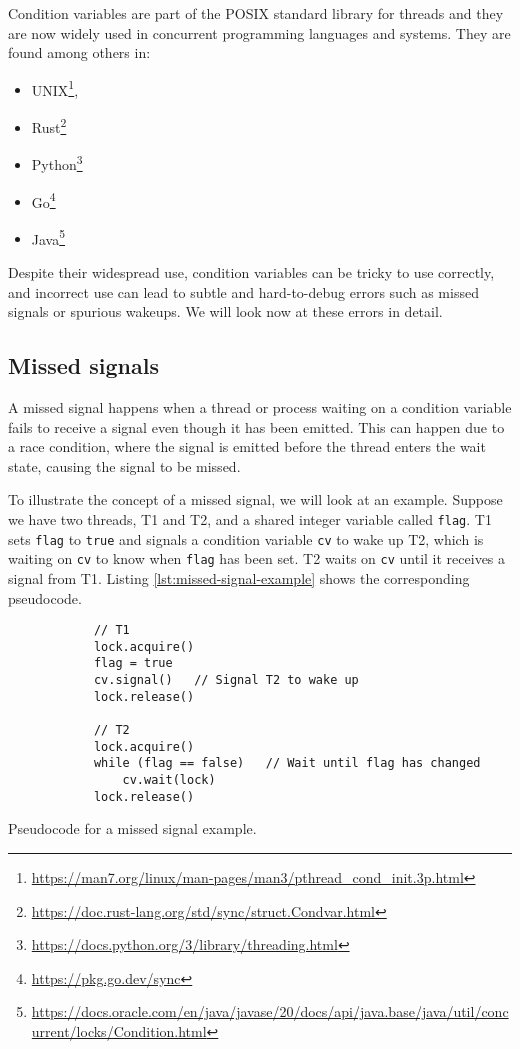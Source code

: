 Condition variables are part of the POSIX standard library for threads \cite{nichols1996pthreads}
and they are now widely used in concurrent programming languages and systems.
They are found among others in:

\begin{itemize}
      \item UNIX\footnote{\url{https://man7.org/linux/man-pages/man3/pthread_cond_init.3p.html}},
      \item Rust\footnote{\url{https://doc.rust-lang.org/std/sync/struct.Condvar.html}}
      \item Python\footnote{\url{https://docs.python.org/3/library/threading.html}}
      \item Go\footnote{\url{https://pkg.go.dev/sync}}
      \item Java\footnote{
                  \url{https://docs.oracle.com/en/java/javase/20/docs/api/java.base/java/util/concurrent/locks/Condition.html}}
\end{itemize}

Despite their widespread use, condition variables can be tricky to use correctly,
and incorrect use can lead to subtle and
hard-to-debug errors such as missed signals or spurious wakeups.
We will look now at these errors in detail.

\subsection{Missed signals}

A missed signal happens when a thread or process waiting on a condition variable
fails to receive a signal even though it has been emitted.
This can happen due to a race condition, where the signal is emitted
before the thread enters the wait state, causing the signal to be missed.

To illustrate the concept of a missed signal, we will look at an example.
Suppose we have two threads, T1 and T2,
and a shared integer variable called \texttt{flag}.
T1 sets \texttt{flag} to \texttt{true} and signals
a condition variable \texttt{cv} to wake up T2,
which is waiting on \texttt{cv} to know when \texttt{flag} has been set.
T2 waits on \texttt{cv} until it receives a signal from T1.
Listing \ref{lst:missed-signal-example} shows the corresponding pseudocode.

\begin{listing}[!htb]
      \begin{verbatim}
            // T1
            lock.acquire()
            flag = true
            cv.signal()   // Signal T2 to wake up
            lock.release()
            
            // T2
            lock.acquire()
            while (flag == false)   // Wait until flag has changed
                cv.wait(lock)
            lock.release()
      \end{verbatim}
      \caption{Pseudocode for a missed signal example.}
      \label{lst:missed-signal-example}
\end{listing}

